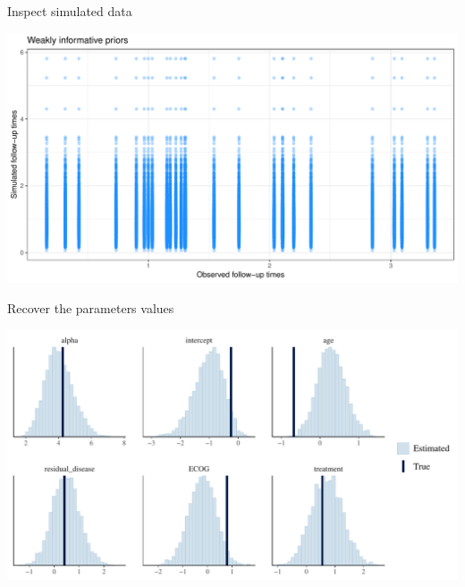 \documentclass[ignorenonframetext,a4paper]{beamer}
\begin{document}
\begin{frame}{Inspect simulated data}

\includegraphics{DB_presentation_case_study_files/figure-beamer/unnamed-chunk-7-1.pdf}

\end{frame}

\begin{frame}{Recover the parameters values}

\includegraphics{DB_presentation_case_study_files/figure-beamer/unnamed-chunk-8-1.pdf}

\end{frame}
\end{document}
